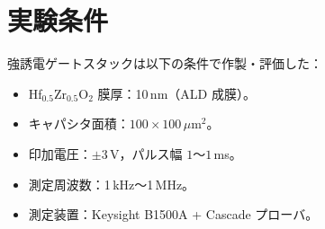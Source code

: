 \section*{実験条件}
強誘電ゲートスタックは以下の条件で作製・評価した：
\begin{itemize}
  \item Hf$_{0.5}$Zr$_{0.5}$O$_2$ 膜厚：10\,nm（ALD 成膜）。
  \item キャパシタ面積：$100 \times 100\,\mu\mathrm{m}^2$。
  \item 印加電圧：$\pm 3$\,V，パルス幅 $1$～$1$\,ms。
  \item 測定周波数：1\,kHz～1\,MHz。
  \item 測定装置：Keysight B1500A + Cascade プローバ。
\end{itemize}
